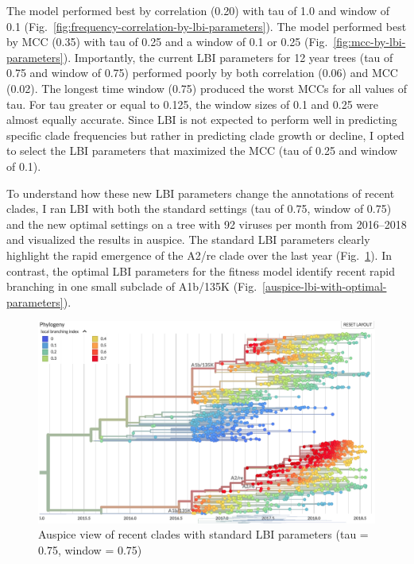 \documentclass[12pt]{article}
\begin{document}
The model performed best by correlation (0.20) with tau of 1.0 and window of 0.1 (Fig.~\ref{fig:frequency-correlation-by-lbi-parameters}).
The model performed best by MCC (0.35) with tau of 0.25 and a window of 0.1 or 0.25 (Fig.~\ref{fig:mcc-by-lbi-parameters}).
Importantly, the current LBI parameters for 12 year trees (tau of 0.75 and window of 0.75) performed poorly by both correlation (0.06) and MCC (0.02).
The longest time window (0.75) produced the worst MCCs for all values of tau.
For tau greater or equal to 0.125, the window sizes of 0.1 and 0.25 were almost equally accurate.
Since LBI is not expected to perform well in predicting specific clade frequencies but rather in predicting clade growth or decline, I opted to select the LBI parameters that maximized the MCC (tau of 0.25 and window of 0.1).

To understand how these new LBI parameters change the annotations of recent clades, I ran LBI with both the standard settings (tau of 0.75, window of 0.75) and the new optimal settings on a tree with 92 viruses per month from 2016--2018 and visualized the results in auspice.
The standard LBI parameters clearly highlight the rapid emergence of the A2/re clade over the last year (Fig.~\ref{auspice-lbi-with-standard-parameters}).
In contrast, the optimal LBI parameters for the fitness model identify recent rapid branching in one small subclade of A1b/135K (Fig.~\ref{auspice-lbi-with-optimal-parameters}).

\begin{figure}[h]
\includegraphics[width=5in]{auspice-lbi-tau-0-75-window-0-75.png}
\caption{\label{auspice-lbi-with-standard-parameters}Auspice view of recent clades with standard LBI parameters (tau = 0.75, window = 0.75)}
\end{figure}
\end{document}
